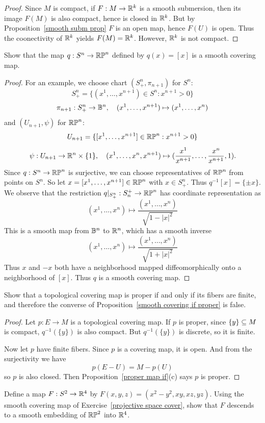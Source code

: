 \begin{proof}
Since $M$ is compact, if $F:M\to\mathbb{R}^k$ is a smooth submersion, then its image $F(M)$ is also compact, hence is closed in $\mathbb{R}^k$. But by Proposition~\ref{smooth subm prop} $F$ is an open map, hence $F(U)$ is open. Thus the coonectivity of $\mathbb{R}^k$ yields $F(M)=\mathbb{R}^k$. However, $\mathbb{R}^k$ is not compact.
\end{proof}
\begin{exercise}\label{projective space cover}
Show that the map $q:S^n\to\mathbb{RP}^n$ defined by $q(x)=[x]$ is a smooth covering map.
\end{exercise}
\begin{proof}
For an example, we choose chart $(S^n_+,\pi_{n+1})$ for $S^n$:
\[S^n_+=\{(x^1,\dots,x^{n+1})\in S^n:x^{n+1}>0\}\]
\[\pi_{n+1}:S^n_+\to\mathbb{B}^n,\quad (x^1,\dots,x^{n+1})\mapsto(x^1,\dots,x^n)\]
and $(U_{n+1},\psi)$ for $\mathbb{RP}^n$: \[U_{n+1}=\{[x^1,\dots,x^{n+1}]\in\mathbb{RP}^n:x^{n+1}>0\}\]
\[\psi:U_{n+1}\to\mathbb{R}^n\times\{1\},\quad(x^1,\dots,x^n,x^{n+1})\mapsto(\frac{x^1}{x^{n+1}},\dots,\frac{x^n}{x^{n+1}},1).\]
Since $q:S^n\to\mathbb{RP}^n$ is surjective, we can choose representatives of $\mathbb{RP}^n$ from points on $S^n$. So let $x=[x^1,\dots,x^{n+1}]\in\mathbb{RP}^n$ with $x\in S^n_+$. Thus $q^{-1}[x]=\{\pm x\}$. We observe that the restriction $q|_{S^n_+}:S_n^+\to\mathbb{RP}^n$ has coordinate representation as
\[(x^1,\dots,x^{n})\mapsto\frac{(x^1,\dots,x^n)}{\sqrt{1-|x|^2}}\]
This is a smooth map from $\mathbb{B}^n$ to $\mathbb{R}^n$, which has a smooth inverse
\[(x^1,\dots,x^n)\mapsto\frac{(x^1,\dots,x^n)}{\sqrt{1+|x|^2}}\]
Thus $x$ and $-x$ both have a neighborhood mapped diffeomorphically onto a neighborhood of $[x]$. Thus $q$ is a smooth covering map.
\end{proof}
\begin{exercise}\label{covering map proper iff}
Show that a topological covering map is proper if and only if its fibers are finite, and therefore the converse of Proposition~\ref{smooth covering if proper} is false.
\end{exercise}
\begin{proof}
Let $p:E\to M$ is a topological covering map. If $p$ is proper, since $\{y\}\subseteq M$ is compact, $q^{-1}(\{y\})$ is also compact. But $q^{-1}(\{y\})$ is discrete, so it is finite.\par
Now let $p$ have finite fibers. Since $p$ is a covering map, it is open. And from the surjectivity we have
\[p(E-U)=M-p(U)\]
so $p$ is also closed. Then Proposition~\ref{proper map if}(c) says $p$ is proper.
\end{proof}
\begin{exercise}
Define a map $F:S^2\to\mathbb{R}^4$ by $F(x,y,z)=(x^2-y^2,xy,xz,yz)$. Using the smooth covering map of Exercise~\ref{projective space cover}, show that $F$ descends to a smooth embedding of $\mathbb{RP}^2$ into $\mathbb{R}^4$.
\end{exercise}
